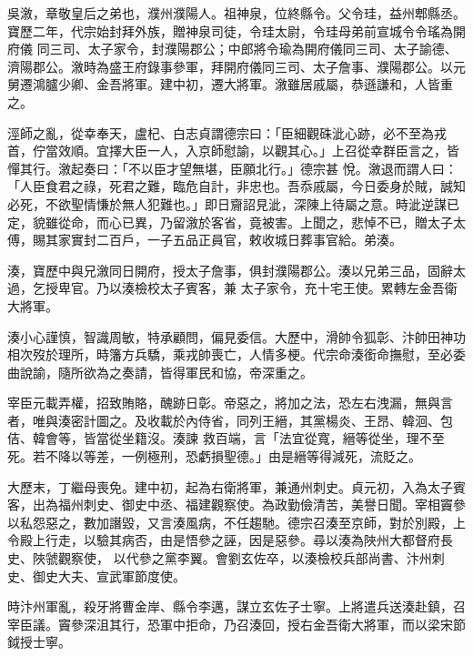 \begin{pinyinscope}
 吳漵，章敬皇后之弟也，濮州濮陽人。祖神泉，位終縣令。父令珪，益州郫縣丞。寶歷二年，代宗始封拜外族，贈神泉司徒，令珪太尉，令珪母弟前宣城令令瑤為開府儀
 同三司、太子家令，封濮陽郡公；中郎將令瑜為開府儀同三司、太子諭德、濟陽郡公。漵時為盛王府錄事參軍，拜開府儀同三司、太子詹事、濮陽郡公。以元舅遷鴻臚少卿、金吾將軍。建中初，遷大將軍。漵雖居戚屬，恭遜謙和，人皆重之。



 涇師之亂，從幸奉天，盧杞、白志貞謂德宗曰：「臣細觀硃泚心跡，必不至為戎首，佇當效順。宜擇大臣一人，入京師慰諭，以觀其心。」上召從幸群臣言之，皆憚其行。漵起奏曰：「不以臣才望無堪，臣願北行。」德宗甚
 悅。漵退而謂人曰：「人臣食君之祿，死君之難，臨危自計，非忠也。吾忝戚屬，今日委身於賊，誠知必死，不欲聖情慊於無人犯難也。」即日齎詔見泚，深陳上待屬之意。時泚逆謀已定，貌雖從命，而心已異，乃留漵於客省，竟被害。上聞之，悲悼不已，贈太子太傅，賜其家實封二百戶，一子五品正員官，敕收城日葬事官給。弟湊。



 湊，寶歷中與兄漵同日開府，授太子詹事，俱封濮陽郡公。湊以兄弟三品，固辭太過，乞授卑官。乃以湊檢校太子賓客，兼
 太子家令，充十宅王使。累轉左金吾衛大將軍。



 湊小心謹慎，智識周敏，特承顧問，偏見委信。大歷中，滑帥令狐彰、汴帥田神功相次歿於理所，時籓方兵驕，乘戎帥喪亡，人情多梗。代宗命湊銜命撫慰，至必委曲說諭，隨所欲為之奏請，皆得軍民和協，帝深重之。



 宰臣元載弄權，招致賄賂，醜跡日彰。帝惡之，將加之法，恐左右洩漏，無與言者，唯與湊密計圖之。及收載於內侍省，同列王縉，其黨楊炎、王昂、韓洄、包佶、韓會等，皆當從坐籍沒。湊諫
 救百端，言「法宜從寬，縉等從坐，理不至死。若不降以等差，一例極刑，恐虧損聖德。」由是縉等得減死，流貶之。



 大歷末，丁繼母喪免。建中初，起為右衛將軍，兼通州刺史。貞元初，入為太子賓客，出為福州刺史、御史中丞、福建觀察使。為政勤儉清苦，美譽日聞。宰相竇參以私怨惡之，數加譖毀，又言湊風病，不任趨馳。德宗召湊至京師，對於別殿，上令殿上行走，以驗其病否，由是悟參之誣，因是惡參。尋以湊為陜州大都督府長史、陜虢觀察使，
 以代參之黨李翼。會劉玄佐卒，以湊檢校兵部尚書、汴州刺史、御史大夫、宣武軍節度使。



 時汴州軍亂，殺牙將曹金岸、縣令李邁，謀立玄佐子士寧。上將遣兵送湊赴鎮，召宰臣議。竇參深沮其行，恐軍中拒命，乃召湊回，授右金吾衛大將軍，而以梁宋節鉞授士寧。




\end{pinyinscope}
